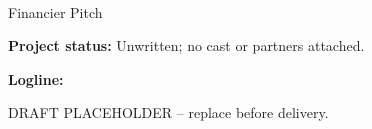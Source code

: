 \documentclass[11pt,letterpaper]{article}
\begin{document}
\begin{center}
{\Large\bfseries\sffamily \filmtitleupper}\\[6pt]
Financier Pitch
\end{center}
\textbf{Project status:} Unwritten; no cast or partners attached.

\textbf{Logline:} \filmlogline

DRAFT PLACEHOLDER -- replace before delivery.
\end{document}
